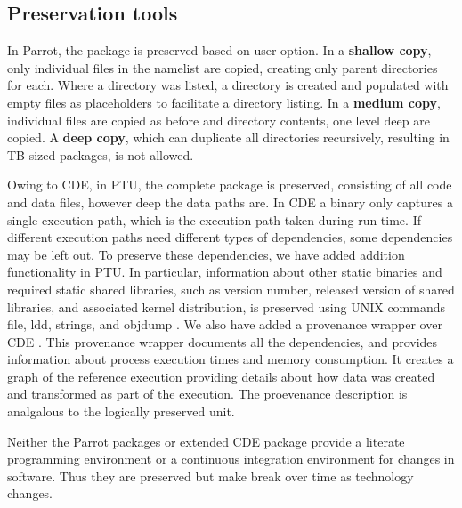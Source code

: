 \subsection{Preservation tools}

\vspace{5pt}
 In Parrot, the package is preserved based on user option.  
In a {\bf shallow copy}, only individual files in the namelist are copied,
creating only parent directories for each.  Where a directory was listed,
a directory is created and populated with empty files as placeholders
to facilitate a directory listing.  In a {\bf medium copy}, 
individual files are copied as before and directory contents, one level deep are copied. A {\bf deep copy}, which can duplicate all directories recursively,
resulting in TB-sized packages, is not allowed. 

\vspace{5pt}
 Owing to CDE, in PTU, the complete package is preserved, consisting of all code and data files, however deep the data paths are. 
In CDE a binary only captures a single execution path, which is the execution path taken during run-time. If different execution paths need different types of dependencies, some dependencies may be left out. To preserve these dependencies, we have added addition functionality in PTU. In particular, information about other static binaries and required static shared libraries, such as version number, released version of shared libraries, and associated kernel distribution, is preserved using UNIX commands file, ldd, strings, and objdump \cite{}. We also have added a provenance wrapper over CDE \cite{}. This provenance wrapper documents all the dependencies, and provides information about process execution times and memory consumption. It creates a graph of the reference execution providing details about how data was created and transformed as part of the execution. The proevenance description is analgalous to the logically preserved unit. 

Neither the Parrot packages or extended CDE package provide a literate programming environment or a continuous integration environment for changes in software. Thus they are preserved but make break over time as technology changes.
 
